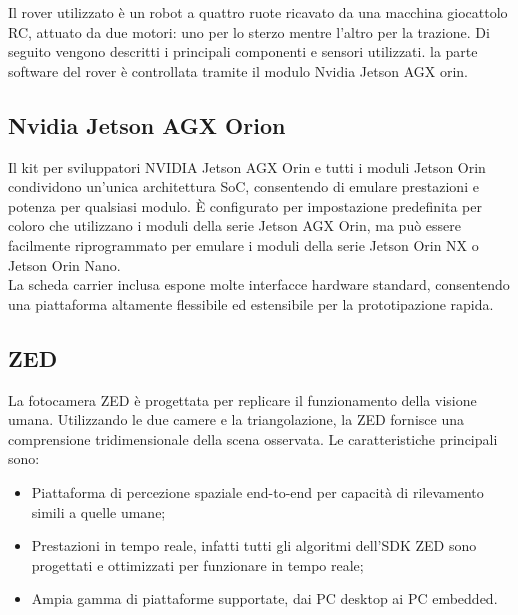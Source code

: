 \label{sec:desc_tec}
Il rover utilizzato è un robot a quattro ruote ricavato da una macchina giocattolo RC, attuato da due motori: uno per lo sterzo mentre l'altro per la trazione. Di seguito vengono descritti i principali componenti e sensori utilizzati. la parte software del rover è controllata tramite il modulo Nvidia Jetson AGX orin.

\subsection{Nvidia Jetson AGX Orion}
Il kit per sviluppatori NVIDIA Jetson AGX Orin  \cite{Nvidia} e tutti i moduli Jetson Orin condividono un'unica architettura SoC, consentendo di emulare prestazioni e potenza per qualsiasi modulo. È configurato per impostazione predefinita per coloro che utilizzano i moduli della serie Jetson AGX Orin, ma può essere facilmente riprogrammato per emulare i moduli della serie Jetson Orin NX o Jetson Orin Nano. \\
La scheda carrier inclusa espone molte interfacce hardware standard, consentendo una piattaforma altamente flessibile ed estensibile per la prototipazione rapida.

\subsection{ZED}
La fotocamera ZED \cite{ZED} è progettata per replicare il funzionamento della visione umana. Utilizzando le due camere e la triangolazione, la ZED fornisce una comprensione tridimensionale della scena osservata.
Le caratteristiche principali sono:
\begin{itemize}
    \item Piattaforma di percezione spaziale end-to-end per capacità di rilevamento simili a quelle umane;
    \item Prestazioni in tempo reale, infatti tutti gli algoritmi dell'SDK ZED sono progettati e ottimizzati per funzionare in tempo reale;
    \item Ampia gamma di piattaforme supportate, dai PC desktop ai PC embedded.
\end{itemize}


